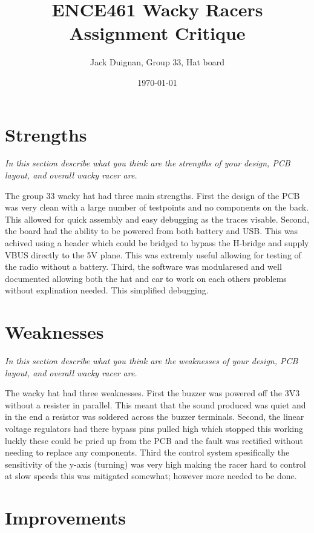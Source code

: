 \documentclass[a4paper,12pt]{article}
\title{ENCE461 Wacky Racers Assignment Critique}
\author{Jack Duignan, Group 33, Hat board}
\date{\today}
\newcommand{\comment}[1]{\emph{\color{blue}#1}}
\begin{document}
\maketitle

\section{Strengths}

\comment{In this section describe what you think are the strengths of
  your design, PCB layout, and overall wacky racer are.}

The group 33 wacky hat had three main strengths. First the design of the PCB was very clean with a large number of testpoints and no components on the back. This allowed for quick assembly and easy debugging as the traces visable. Second, the board had the ability to be powered from both battery and USB. This was achived using a header which could be bridged to bypass the H-bridge and supply VBUS directly to the 5V plane. This was extremly useful allowing for testing of the radio without a battery. Third, the software was modularesed and well documented allowing both the hat and car to work on each others problems without explination needed. This simplified debugging.

\section{Weaknesses}

\comment{In this section describe what you think are the weaknesses of
  your design, PCB layout, and overall wacky racer are.}

The wacky hat had three weaknesses. First the buzzer was powered off the 3V3 without a resister in parallel. This meant that the sound produced was quiet and in the end a resistor was soldered across the buzzer terminals. Second, the linear voltage regulators had there bypass pins pulled high which stopped this working luckly these could be pried up from the PCB and the fault was rectified without needing to replace any components. Third the control system spesifically the sensitivity of the y-axis (turning) was very high making the racer hard to control at slow speeds this was mitigated somewhat; however more needed to be done.

\section{Improvements}
\end{document}
